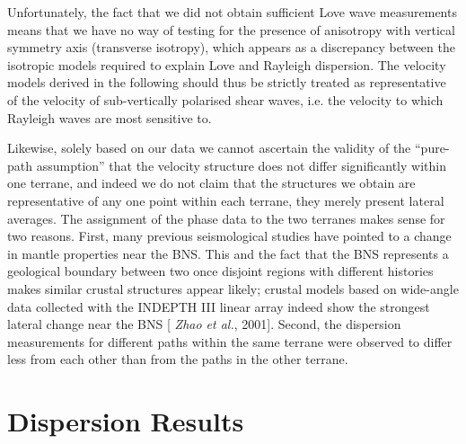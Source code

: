 \documentclass[12pt]{article}
\begin{document}
 Unfortunately, the fact that we did not obtain sufficient Love
wave measurements means that we have no way of testing for the presence
  of anisotropy with vertical symmetry axis (transverse isotropy), which
 appears as a discrepancy between the isotropic models required to explain Love and
 Rayleigh dispersion.  The velocity models derived in the following should thus
 be strictly treated as representative of the velocity of sub-vertically
 polarised shear waves, i.e. the velocity to which Rayleigh waves are most
 sensitive to.

Likewise, solely based on our data we cannot ascertain the validity of the
  ``pure-path assumption'' that the
  velocity structure does not differ significantly within one terrane, and
  indeed we do not claim that the structures we obtain are representative of any
  one point within each terrane, they merely present lateral averages.  The
  assignment of the phase data to the two terranes makes sense for two reasons.
First, many previous seismological studies have pointed to a change in mantle
  properties near the BNS.  This and the
  fact that the BNS represents a geological boundary between two once disjoint
  regions with different histories makes similar crustal
  structures appear likely; crustal models based on wide-angle data collected with the INDEPTH
  III linear array indeed show the strongest lateral change near the BNS [{\it
    Zhao et al.}, 2001].  Second, the dispersion measurements for different paths within the same terrane
  were observed to differ less from each other than from the paths
  in the other terrane.


\section{Dispersion Results} 
\end{document}

